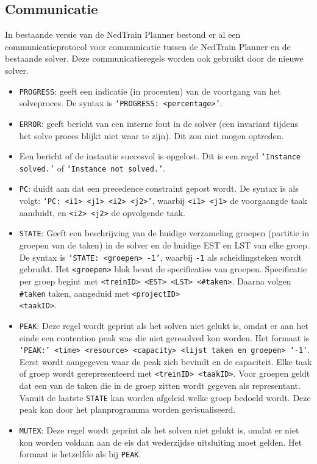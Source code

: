 \subsection{Communicatie}
In bestaande versie van de NedTrain Planner bestond er al een communicatieprotocol voor communicatie tussen de NedTrain Planner en de bestaande solver. Deze communicatieregels worden ook gebruikt door de nieuwe solver. 
\begin{itemize}
    \item \texttt{PROGRESS}: geeft een indicatie (in procenten) van de voortgang van het solveproces. De syntax is \texttt{\textquoteleft PROGRESS: <percentage>\textquoteright}.
    \item \texttt{ERROR}: geeft bericht van een interne fout in de solver (een invariant tijdens het solve proces blijkt niet waar te zijn). Dit zou niet mogen optreden.
    \item Een bericht of de instantie succesvol is opgelost. Dit is een regel \texttt{\textquoteleft Instance solved.\textquoteright} of \texttt{\textquoteleft Instance not solved.\textquoteright}.
    \item \texttt{PC}: duidt aan dat een precedence constraint gepost wordt. De syntax is als volgt: \texttt{\textquoteleft PC: <i1> <j1> <i2> <j2>\textquoteright}, waarbij \texttt{<i1> <j1>} de voorgaangde taak aanduidt, en \texttt{<i2> <j2>} de opvolgende taak.
    \item \texttt{STATE}: Geeft een beschrijving van de huidige verzameling groepen (partitie in groepen van de taken) in de solver en de huidige EST en LST van elke groep. De syntax is \texttt{\textquoteleft STATE: <groepen> -1\textquoteright}, waarbij \texttt{-1} als scheidingsteken wordt gebruikt. Het \texttt{<groepen>} blok bevat de specificaties van groepen. Specificatie per groep begint met \texttt{<treinID> <EST> <LST> <\#taken>}. Daarna volgen \texttt{\#taken} taken, aangeduid met \texttt{<projectID>} \\ \texttt{<taakID>}.
    \item \texttt{PEAK}: Deze regel wordt geprint als het solven niet gelukt is, omdat er aan het einde een contention peak was die niet geresolved kon worden. Het formaat is \texttt{\textquoteleft PEAK:\textquoteright \ <time> <resource> <capacity> <lijst taken en groepen> \textquoteleft -1\textquoteright}. Eerst wordt aangegeven waar de peak zich bevindt en de capaciteit. Elke taak of groep wordt gerepresenteerd met \texttt{<treinID> <taakID>}. Voor groepen geldt dat een van de taken die in de groep zitten wordt gegeven als representant. Vanuit de laatste \texttt{STATE} kan worden afgeleid welke groep bedoeld wordt. Deze peak kan door het planprogramma worden gevisualiseerd.
    \item \texttt{MUTEX}: Deze regel wordt geprint als het solven niet gelukt is, omdat er niet kon worden voldaan aan de eis dat wederzijdse uitsluiting moet gelden. Het formaat is hetzelfde als bij \texttt{PEAK}.
\end{itemize}
